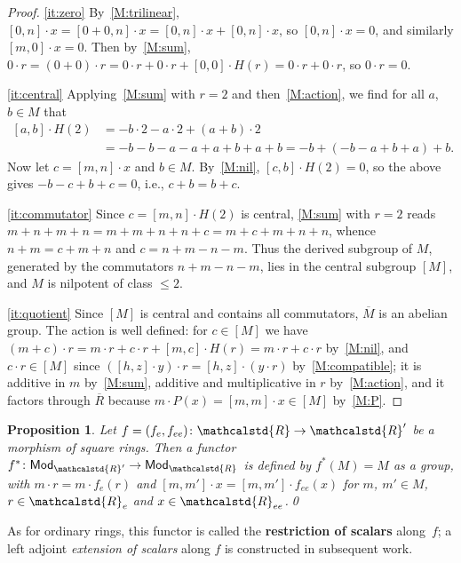 \documentclass[reqno,a4paper]{amsart}
\theoremstyle{plain}
\newtheorem{proposition}[subsection]{Proposition}
\theoremstyle{definition}
\newcommand{\defn}{\textbf}
\newcommand{\noproof}{\hfill\qed}
\newcommand{\R}{\ensuremath{\mathcalstd{R}}}
\newcommand{\Mod}{\ensuremath{\mathsf{Mod}}}
\renewcommand{\Re}{\ensuremath{\R_{e}}}
\newcommand{\Ree}{\ensuremath{\R_{ee}}}
\newcommand{\Rbar}{\ensuremath{\overline{R}}}
\newcommand{\brk}[2]{\ensuremath{[#1,#2]}}
\begin{document}
\begin{proof}
  \ref{it:zero} By~\ref{M:trilinear}, \(\brk{0}{n}\cdot x=\brk{0+0}{n}\cdot x=\brk{0}{n}\cdot x+\brk{0}{n}\cdot x\), so \(\brk{0}{n}\cdot x=0\), and similarly \(\brk{m}{0}\cdot x=0\). Then by~\ref{M:sum}, \(0\cdot r=(0+0)\cdot r=0\cdot r+0\cdot r+\brk{0}{0}\cdot H(r)=0\cdot r+0\cdot r\), so \(0\cdot r=0\).

  \ref{it:central} Applying~\ref{M:sum} with \(r=2\) and then~\ref{M:action}, we find for all \(a\), \(b\in M\) that
  \begin{align*}
    \brk{a}{b}\cdot H(2) & =-b\cdot 2-a\cdot 2+(a+b)\cdot 2          \\
                         & =-b-b-a-a+a+b+a+b=-b+(-b-a+b+a)+b\text{.}
  \end{align*}
  Now let \(c=\brk{m}{n}\cdot x\) and \(b\in M\). By~\ref{M:nil}, \(\brk{c}{b}\cdot H(2)=0\), so the above gives \(-b-c+b+c=0\), i.e., \(c+b=b+c\).

  \ref{it:commutator} Since \(c=\brk{m}{n}\cdot H(2)\) is central, \ref{M:sum} with \(r=2\) reads \(m+n+m+n=m+m+n+n+c=m+c+m+n+n\), whence \(n+m=c+m+n\) and \(c=n+m-n-m\). Thus the derived subgroup of \(M\), generated by the commutators \(n+m-n-m\), lies in the central subgroup \([M]\), and \(M\) is nilpotent of class \(\leq 2\).

  \ref{it:quotient} Since \([M]\) is central and contains all commutators, \(\overline{M}\) is an abelian group. The action is well defined: for \(c\in[M]\) we have \((m+c)\cdot r=m\cdot r+c\cdot r+\brk{m}{c}\cdot H(r)=m\cdot r+c\cdot r\) by~\ref{M:nil}, and \(c\cdot r\in[M]\) since \((\brk{h}{z}\cdot y)\cdot r=\brk{h}{z}\cdot(y\cdot r)\) by~\ref{M:compatible}; it is additive in \(m\) by~\ref{M:sum}, additive and multiplicative in \(r\) by~\ref{M:action}, and it factors through \(\Rbar\) because \(m\cdot P(x)=\brk{m}{m}\cdot x\in[M]\) by~\ref{M:P}.
\end{proof}

\begin{proposition}\label{prop:restriction-of-scalars}
  Let \(f=(f_{e},f_{ee})\colon \R\to\R'\) be a morphism of square rings. Then a functor \(f^{*}\colon \Mod_{\R'}\to\Mod_{\R}\) is defined by \(f^{*}(M)=M\) as a group, with \(m\cdot r=m\cdot f_{e}(r)\) and \(\brk{m}{m'}\cdot x=\brk{m}{m'}\cdot f_{ee}(x)\) for \(m\), \(m'\in M\), \(r\in\Re\) and \(x\in\Ree\).\noproof
\end{proposition}

As for ordinary rings, this functor is called the \defn{restriction of scalars} along~\(f\); a left adjoint \emph{extension of scalars} along \(f\) is constructed in subsequent work.
\end{document}
